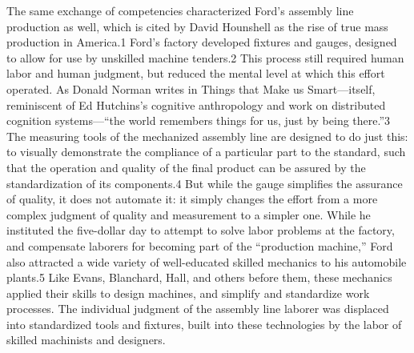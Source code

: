 The same exchange of competencies characterized Ford's assembly line
production as well, which is cited by David Hounshell as the rise of
true mass production in America.1 Ford's factory developed fixtures
and gauges, designed to allow for use by unskilled machine tenders.2
This process still required human labor and human judgment, but
reduced the mental level at which this effort operated. As Donald
Norman writes in Things that Make us Smart—itself, reminiscent of Ed
Hutchins's cognitive anthropology and work on distributed cognition
systems—“the world remembers things for us, just by being there.”3 The
measuring tools of the mechanized assembly line are designed to do
just this: to visually demonstrate the compliance of a particular part
to the standard, such that the operation and quality of the final
product can be assured by  the standardization of its components.4 But
while the gauge simplifies the assurance of quality, it does not
automate it: it simply changes the effort from a more complex judgment
of quality and measurement to a simpler one. While he instituted the
five-dollar day to attempt to solve labor problems at the factory, and
compensate laborers for becoming part of the “production machine,”
Ford also attracted a wide variety of well-educated skilled mechanics
to his automobile plants.5 Like Evans, Blanchard, Hall, and others
before them, these mechanics applied their skills to design machines,
and simplify and standardize work processes. The individual judgment
of the assembly line laborer was displaced into standardized tools and
fixtures, built into these technologies by the labor of skilled
machinists and designers.

